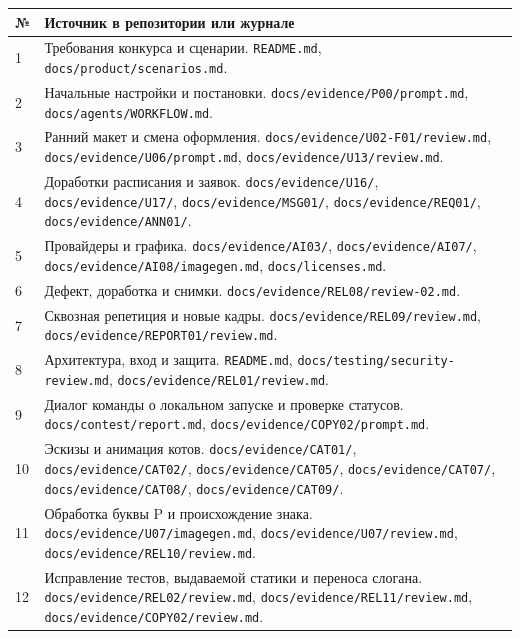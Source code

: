 \documentclass[11pt,a4paper]{article}
\renewcommand{\arraystretch}{1.26}
\newcommand{\repo}[1]{\textcolor{muted}{\footnotesize\nolinkurl{#1}}}
\begin{document}
{\fontsize{8.7}{11}\selectfont
\renewcommand{\arraystretch}{1.13}
\begin{tabularx}{\linewidth}{@{}L{7mm}Y@{}}
\toprule
\textbf{№} & \textbf{Источник в репозитории или журнале}\\
 & Требования конкурса и сценарии. \repo{README.md}, \repo{docs/product/scenarios.md}.\\
2 & Начальные настройки и постановки. \repo{docs/evidence/P00/prompt.md}, \repo{docs/agents/WORKFLOW.md}.\\
3 & Ранний макет и смена оформления. \repo{docs/evidence/U02-F01/review.md}, \repo{docs/evidence/U06/prompt.md}, \repo{docs/evidence/U13/review.md}.\\
4 & Доработки расписания и заявок. \repo{docs/evidence/U16/}, \repo{docs/evidence/U17/}, \repo{docs/evidence/MSG01/}, \repo{docs/evidence/REQ01/}, \repo{docs/evidence/ANN01/}.\\
5 & Провайдеры и графика. \repo{docs/evidence/AI03/}, \repo{docs/evidence/AI07/}, \repo{docs/evidence/AI08/imagegen.md}, \repo{docs/licenses.md}.\\
6 & Дефект, доработка и снимки. \repo{docs/evidence/REL08/review-02.md}.\\
7 & Сквозная репетиция и новые кадры. \repo{docs/evidence/REL09/review.md}, \repo{docs/evidence/REPORT01/review.md}.\\
8 & Архитектура, вход и защита. \repo{README.md}, \repo{docs/testing/security-review.md}, \repo{docs/evidence/REL01/review.md}.\\
9 & Диалог команды о локальном запуске и проверке статусов. \repo{docs/contest/report.md}, \repo{docs/evidence/COPY02/prompt.md}.\\
10 & Эскизы и анимация котов. \repo{docs/evidence/CAT01/}, \repo{docs/evidence/CAT02/}, \repo{docs/evidence/CAT05/}, \repo{docs/evidence/CAT07/}, \repo{docs/evidence/CAT08/}, \repo{docs/evidence/CAT09/}.\\
11 & Обработка буквы P и происхождение знака. \repo{docs/evidence/U07/imagegen.md}, \repo{docs/evidence/U07/review.md}, \repo{docs/evidence/REL10/review.md}.\\
12 & Исправление тестов, выдаваемой статики и переноса слогана. \repo{docs/evidence/REL02/review.md}, \repo{docs/evidence/REL11/review.md}, \repo{docs/evidence/COPY02/review.md}.\\
\bottomrule
\end{tabularx}}
\end{document}
